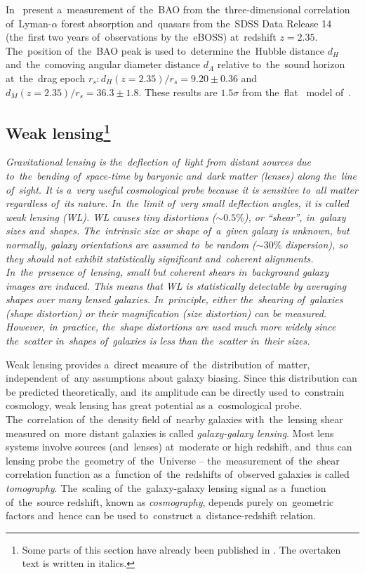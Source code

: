 In~\textcite{BAO_results} present a~measurement of~the~BAO from the~three-dimensional correlation of~Lyman-$\alpha$ forest absorption and~quasars from the~SDSS Data Release 14 (the~first two years of~observations by the~eBOSS) at~redshift $z=2.35$. The~position of~the~BAO peak is used to~determine the~Hubble distance $d_H$ and~the~comoving angular diameter distance $d_A$ relative to~the~sound horizon at~the~drag epoch $r_s: d_H(z=2.35)/r_s = 9.20\pm0.36$ and~$d_M(z=2.35)/r_s = 36.3\pm1.8$. These results are $1.5\sigma$ from the~flat \LCDM\ model of~\textcite{2016A&A...594A..13P}.
\subsection[Weak lensing]{Weak lensing\footnote{Some parts of this section have already been published in \textcite{mastersthesis_vrastil}. The overtaken text is written in italics.}}
\label{ssec:wl}
{\itshape
Gravitational lensing is the~deflection of~light from distant sources due to~the~bending of~space-time by baryonic and~dark matter (lenses) along the~line of~sight. It is a~very useful cosmological probe because it is sensitive to~all matter regardless of~its nature. In~the~limit of~very small deflection angles, it is called weak lensing (WL). WL causes tiny distortions ($\sim0.5\%$), or ``shear'', in~galaxy sizes and~shapes. The~intrinsic size or shape of~a~given galaxy is unknown, but normally, galaxy orientations are assumed to~be random ($\sim30\%$ dispersion), so they should not exhibit statistically significant and~coherent alignments. In~the~presence of~lensing, small but coherent shears in~background galaxy images are induced. This means that WL is statistically detectable by averaging shapes over many lensed galaxies. In~principle, either the~shearing of~galaxies (shape distortion) or their magnification (size distortion) can be measured. However, in~practice, the~shape distortions are used much more widely since the~scatter in~shapes of~galaxies is less than the~scatter in~their sizes.

Weak lensing provides a~direct measure of~the~distribution of~matter, independent of~any assumptions about galaxy biasing. Since this distribution can be predicted theoretically, and~its amplitude can be directly used to~constrain cosmology, weak lensing has great potential as a~cosmological probe. The~correlation of~the~density field of~nearby galaxies with~the~lensing shear measured on~more distant galaxies is called \textit{galaxy-galaxy lensing}. Most lens systems involve sources (and~lenses) at~moderate or high redshift, and~thus can lensing probe the~geometry of~the~Universe -- the~measurement of~the~shear correlation function as a~function of~the~redshifts of~observed galaxies is called \textit{tomography}. The~scaling of~the~galaxy-galaxy lensing signal as a~function of~the~source redshift, known as \textit{cosmography}, depends purely on~geometric factors and~hence can be used to~construct a~distance-redshift relation.
}
